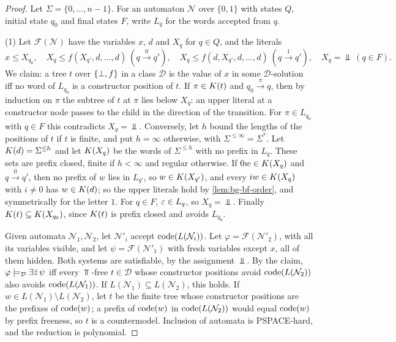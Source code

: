 \begin{proof}
Let $\Sigma=\{0,\ldots,n-1\}$. For an automaton $\mathcal N$ over $\{0,1\}$
with states $Q$, initial state $q_0$ and final states $F$, write $L_q$ for the
words accepted from $q$.

(1) Let $\mathcal F(\mathcal N)$ have the variables $x$, $d$ and $X_q$ for
$q\in Q$, and the literals
\[
 x\le X_{q_0},\quad X_q\le f(X_{q'},d,\ldots,d)\ (q\xrightarrow0q'),\quad
 X_q\le f(d,X_{q'},d,\ldots,d)\ (q\xrightarrow1q'),\quad X_q=\Bot\ (q\in F).
\]
We claim: a tree $t$ over $\{\bot,f\}$ in a class $\mathcal D$ is the value of $x$ in
some $\mathcal D$-solution iff no word of $L_{q_0}$ is a constructor position
of $t$. If $\pi\in K(t)$ and $q_0\xrightarrow\pi q$, then by induction on
$\pi$ the subtree of $t$ at $\pi$ lies below $X_q$: an upper literal at a
constructor node passes to the child in the direction of the transition. For
$\pi\in L_{q_0}$ with $q\in F$ this contradicts $X_q=\Bot$. Conversely, let $h$
bound the lengths of the positions of $t$ if $t$ is finite, and put
$h=\infty$ otherwise, with $\Sigma^{\le\infty}=\Sigma^*$. Let $K(d)=\Sigma^{\le h}$ and let $K(X_q)$ be the
words of $\Sigma^{\le h}$ with no prefix in $L_q$. These sets are prefix
closed, finite if $h<\infty$ and regular otherwise. If $0w\in K(X_q)$ and
$q\xrightarrow0q'$, then no prefix of $w$ lies in $L_{q'}$, so
$w\in K(X_{q'})$, and every $iw\in K(X_q)$ with $i\ne0$ has
$w\in K(d)$; so the upper literals hold by \cref{lem:bg-bf-order}, and
symmetrically for the letter $1$. For $q\in F$, $\varepsilon\in L_q$, so $X_q=\Bot$.
Finally $K(t)\subseteq K(X_{q_0})$, since $K(t)$ is prefix closed and
avoids $L_{q_0}$.

Given automata $\mathcal N_1,\mathcal N_2$, let $\mathcal N'_i$ accept
$\operatorname{code}(L(\mathcal N_i))$. Let $\varphi=\mathcal F(\mathcal N'_2)$, with all
its variables visible, and let $\psi=\mathcal F(\mathcal N'_1)$ with fresh
variables except $x$, all of them hidden. Both systems are satisfiable, by the
assignment $\Bot$. By the claim, $\varphi\models_{\mathcal D}\exists\bar z\,\psi$ iff
every $\Top$-free $t\in\mathcal D$ whose constructor positions avoid
$\operatorname{code}(L(\mathcal N_2))$ also avoids $\operatorname{code}(L(\mathcal N_1))$. If
$L(\mathcal N_1)\subseteq L(\mathcal N_2)$, this holds. If $w\in L(\mathcal
N_1)\setminus L(\mathcal N_2)$, let $t$ be the finite tree whose constructor
positions are the prefixes of $\operatorname{code}(w)$; a prefix of $\operatorname{code}(w)$ in
$\operatorname{code}(L(\mathcal N_2))$ would equal $\operatorname{code}(w)$ by prefix freeness, so $t$
is a countermodel. Inclusion of automata is PSPACE-hard, and the reduction is
polynomial.


\end{proof}
